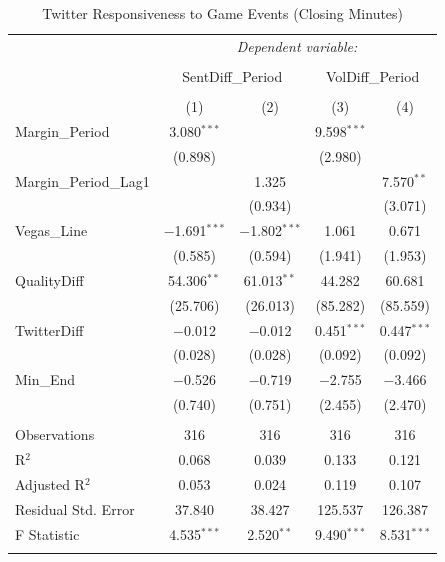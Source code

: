 \documentclass[12pt]{article}
\begin{document}
\begin{doublespacing}
\begin{table}[H] 
\centering 
\caption{Twitter Responsiveness to Game Events (Closing Minutes)} 
\label{table:endgamesensitivity} 
\begin{tabular*}{\textwidth}{@{\extracolsep{\fill}}lcccc} 
\hline 
\hline
 & \multicolumn{4}{c}{\textit{Dependent variable:}} \\ 
\cline{2-5} 
\\[-3.0ex] & \multicolumn{2}{c}{SentDiff\_Period} & \multicolumn{2}{c}{VolDiff\_Period} \\ 
\\[-1.5ex] & (1) & (2) & (3) & (4)\\ 
\hline
 Margin\_Period & 3.080$^{***}$ &  & 9.598$^{***}$ &  \\ 
  & (0.898) &  & (2.980) &  \\ 
 Margin\_Period\_Lag1 &  & 1.325 &  & 7.570$^{**}$ \\ 
  &  & (0.934) &  & (3.071) \\ 
 Vegas\_Line & $-$1.691$^{***}$ & $-$1.802$^{***}$ & 1.061 & 0.671 \\ 
  & (0.585) & (0.594) & (1.941) & (1.953) \\ 
 QualityDiff & 54.306$^{**}$ & 61.013$^{**}$ & 44.282 & 60.681 \\ 
  & (25.706) & (26.013) & (85.282) & (85.559) \\ 
 TwitterDiff & $-$0.012 & $-$0.012 & 0.451$^{***}$ & 0.447$^{***}$ \\ 
  & (0.028) & (0.028) & (0.092) & (0.092) \\ 
 Min\_End & $-$0.526 & $-$0.719 & $-$2.755 & $-$3.466 \\ 
  & (0.740) & (0.751) & (2.455) & (2.470) \\ 
\hline \\[-1.8ex] 
Observations & 316 & 316 & 316 & 316 \\ 
R$^{2}$ & 0.068 & 0.039 & 0.133 & 0.121 \\ 
Adjusted R$^{2}$ & 0.053 & 0.024 & 0.119 & 0.107 \\ 
Residual Std. Error & 37.840 & 38.427 & 125.537 & 126.387 \\ 
F Statistic & 4.535$^{***}$ & 2.520$^{**}$ & 9.490$^{***}$ & 8.531$^{***}$ \\ 
\hline 
\hline \\[-1.8ex] 
\end{tabular*} 
\end{table} 


\end{doublespacing}
\end{document}
